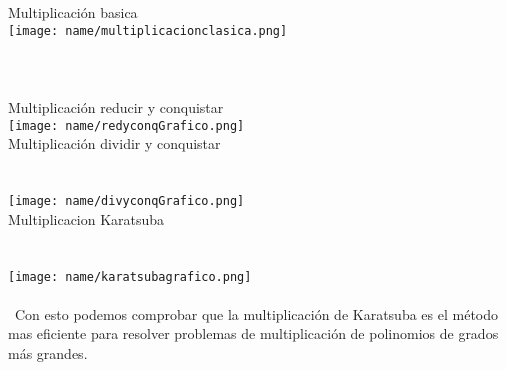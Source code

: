 Multiplicación basica\\
\texttt{[image: name/multiplicacionclasica.png]}\\\\\\\\
Multiplicación reducir y conquistar
\\
\texttt{[image: name/redyconqGrafico.png]}\\
\newpage
Multiplicación dividir y conquistar
\\\\\\
\texttt{[image: name/divyconqGrafico.png]}\\
Multiplicacion Karatsuba\\\\\\
\texttt{[image: name/karatsubagrafico.png]}\\\\\
Con esto podemos comprobar que la multiplicación de Karatsuba es el método mas eficiente
para resolver problemas de multiplicación de polinomios de grados más grandes.
%  




